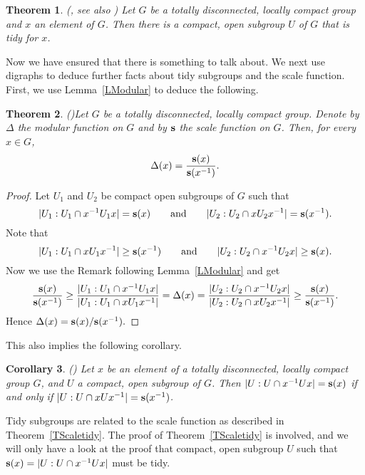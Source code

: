 \documentclass{emsprocart}
\newtheorem{theorem}{Theorem}[section]
\newtheorem{corollary}[theorem]{Corollary}
\theoremstyle{definition}
\begin{document}
\begin{theorem}{\rm (\cite[Theorem 1]{Willis1994},
see also \cite[Theorem 4.1]{Moller2002})}
Let $G$ be a totally disconnected, locally compact group and $x$ an
element of $G$.  Then there is a compact, open subgroup $U$ of $G$ that
is tidy for $x$.
\end{theorem}

Now we have ensured that there is something to talk about.
We next use digraphs to deduce further facts about tidy subgroups
and the scale function.
First, we use Lemma~\ref{LModular} to deduce
the following.

\begin{theorem}{\rm (\cite[Corollary 1]{Willis1994})}\label{Tscale-modular}
Let $G$ be a totally disconnected, locally compact group.  Denote by
$\Delta$ the modular function on $G$ and by ${\bf s}$ the scale
function on $G$.  Then, for every $x\in G$,
$$\Delta(x)=\frac{{\bf s}(x)}{{\bf s}(x^{-1})}.$$
\end{theorem}

\begin{proof}  Let $U_1$ and $U_2$ be compact open subgroups of $G$ such
that
$$|U_1:U_1\cap x^{-1}U_1x|={\bf s}(x)\qquad\mbox{and}
\qquad |U_2:U_2\cap xU_2x^{-1}|={\bf s}(x^{-1}).$$
Note that
$$|U_1:U_1\cap xU_1x^{-1}|\geq {\bf s}(x^{-1})
\qquad\mbox{and}\qquad
|U_2:U_2\cap x^{-1}U_2x|\geq {\bf s}(x).$$
Now we use the Remark following Lemma~\ref{LModular} and get
$$\frac{{\bf s}(x)}{{\bf s}(x^{-1})}\geq
\frac{|U_1:U_1\cap x^{-1}U_1x|}{|U_1:U_1\cap xU_1x^{-1}|}
=\Delta(x)=\frac{|U_2:U_2\cap x^{-1}U_2x|}{|U_2:U_2\cap xU_2x^{-1}|}
\geq \frac{{\bf s}(x)}{{\bf s}(x^{-1})}.$$
Hence $\Delta(x)={\bf s}(x)/{\bf s}(x^{-1}).$   \end{proof}

\medskip

This also implies the following corollary.

\begin{corollary}{\rm (\cite[Corollary 3.11]{Willis2001a})}
\label{Cequal}
Let $x$ be an element of a totally disconnected, locally compact group $G$,
and  $U$  a compact, open subgroup of $G$.
Then $|U:U\cap x^{-1}Ux|={\bf s}(x)$ if and
only if $|U:U\cap xUx^{-1}|={\bf s}(x^{-1})$.
\end{corollary}

Tidy subgroups are related to the scale function as described in
Theorem~\ref{TScaletidy}.  The proof of  Theorem~\ref{TScaletidy} is
involved, and we will only have a look at the proof that compact, open
subgroup $U$ such that ${\bf s}(x)=|U:U\cap x^{-1}Ux|$ must be tidy.
\end{document}

